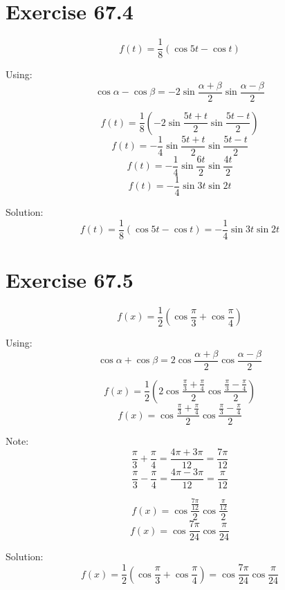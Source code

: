 \documentclass[a4paper, 10pt]{scrartcl}
\begin{document}
\section{Exercise 67.4}

\[f(t) = \frac{1}{8}(\cos{5t} - \cos{t})\]

Using:
\[\cos{\alpha} - \cos{\beta} = -2\sin{\frac{\alpha + \beta}{2}}\sin{\frac{\alpha - \beta}{2}}\]

\[f(t) = \frac{1}{8}(-2\sin{\frac{5t + t}{2}}\sin{\frac{5t - t}{2}})\]
\[f(t) = -\frac{1}{4}\sin{\frac{5t + t}{2}}\sin{\frac{5t - t}{2}}\]
\[f(t) = -\frac{1}{4}\sin{\frac{6t}{2}}\sin{\frac{4t}{2}}\]
\[f(t) = -\frac{1}{4}\sin{3t}\sin{2t}\]

Solution:
\[f(t) = \frac{1}{8}(\cos{5t} - \cos{t}) = -\frac{1}{4}\sin{3t}\sin{2t}\]

\section{Exercise 67.5}

\[f(x) = \frac{1}{2}(\cos{\frac{\pi}{3}} + \cos{\frac{\pi}{4}})\]

Using:
\[\cos{\alpha} + \cos{\beta} = 2\cos{\frac{\alpha + \beta}{2}}\cos{\frac{\alpha - \beta}{2}}\]

\[f(x) = \frac{1}{2}(2\cos{\frac{\frac{\pi}{3} + \frac{\pi}{4}}{2}}\cos{\frac{\frac{\pi}{3} - \frac{\pi}{4}}{2}})\]
\[f(x) = \cos{\frac{\frac{\pi}{3} + \frac{\pi}{4}}{2}}\cos{\frac{\frac{\pi}{3} - \frac{\pi}{4}}{2}}\]

Note:
\[\frac{\pi}{3} + \frac{\pi}{4} = \frac{4\pi + 3\pi}{12} = \frac{7\pi}{12}\]
\[\frac{\pi}{3} - \frac{\pi}{4} = \frac{4\pi - 3\pi}{12} = \frac{\pi}{12}\]

\[f(x) = \cos{\frac{\frac{7\pi}{12}}{2}}\cos{\frac{\frac{\pi}{12}}{2}}\]
\[f(x) = \cos{\frac{7\pi}{24}}\cos{\frac{\pi}{24}}\]

Solution:
\[f(x) = \frac{1}{2}(\cos{\frac{\pi}{3}} + \cos{\frac{\pi}{4}}) = \cos{\frac{7\pi}{24}}\cos{\frac{\pi}{24}}\]
\end{document}
